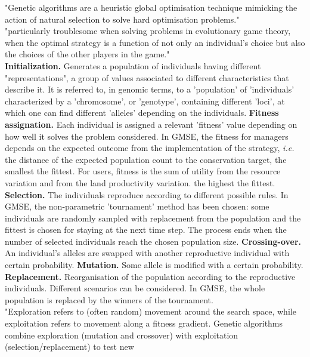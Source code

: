 \documentclass[12pt]{article}
\begin{document}
"Genetic algorithms are a heuristic global optimisation technique mimicking the action of natural selection to
solve hard optimisation problems."\\
"particularly troublesome when solving
problems in evolutionary game theory, when the optimal
strategy is a function of not only an individual’s choice but also
the choices of the other players in the game."\\
\textbf{Initialization.} Generates a population of individuals having different "representations", a group of values associated to different characteristics that describe it.
It is referred to, in genomic terms, to a 'population' of 'individuals' characterized by a 'chromosome', or 'genotype', containing different 'loci', at which one can find different 'alleles' depending on the individuals.
\textbf{Fitness assignation.} Each individual is assigned a relevant 'fitness' value depending on how well it solves the problem considered.
In GMSE, the fitness for managers depends on the expected outcome from the implementation of the strategy, \textit{i.e.} the distance of the expected population count to the conservation target, the smallest the fittest.
For users, fitness is the sum of utility from the resource variation and from the land productivity variation. the highest the fittest. 
\textbf{Selection.} The individuals reproduce according to different possible rules. %
In GMSE, the non-parametric 'tournament' method has been chosen: some individuals are randomly sampled with replacement from the population and the fittest is chosen for staying at the next time step. The process ends when the number of selected individuals reach the chosen population size.
\textbf{Crossing-over.} An individual's alleles are swapped with another reproductive individual with certain probability.
\textbf{Mutation.} Some allele is modified with a certain probability.
\textbf{Replacement.} Reorganisation of the population according to the reproductive individuals. Different scenarios can be considered. In GMSE, the whole population is replaced by the winners of the tournament.\\
"Exploration
refers to (often random) movement around the search space,
while exploitation refers to movement along a fitness gradient.
Genetic algorithms combine exploration (mutation and crossover)
with exploitation (selection/replacement) to test new
\end{document}
